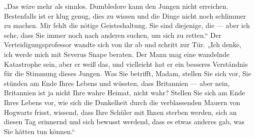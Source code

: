 „Das wäre mehr als sinnlos. Dumbledore kann den Jungen nicht erreichen. Bestenfalls ist er klug genug, dies zu wissen und die Dinge nicht noch schlimmer zu machen. Mir fehlt die nötige Geisteshaltung. Sie sind diejenige, die — aber ich sehe, dass Sie immer noch nach anderen suchen, um sich zu retten.“ Der Verteidigungsprofessor wandte sich von ihr ab und schritt zur Tür.
„Ich denke, ich werde mich mit Severus Snape beraten. Der Mann mag eine wandelnde Katastrophe sein, aber er weiß das, und vielleicht hat er ein besseres Verständnis für die Stimmung dieses Jungen. Was Sie betrifft, Madam, stellen Sie sich vor, Sie stünden am Ende Ihres Lebens und wüssten, dass Britannien — aber nein, Britannien ist ja nicht Ihre wahre Heimat, nicht wahr? Stellen Sie sich am Ende Ihres Lebens vor, wie sich die Dunkelheit durch die verblassenden Mauern von Hogwarts frisst, wissend, dass Ihre Schüler mit Ihnen sterben werden, sich an diesen Tag erinnernd und sich bewusst werdend, dass es etwas anderes gab, was Sie hätten tun können.“

